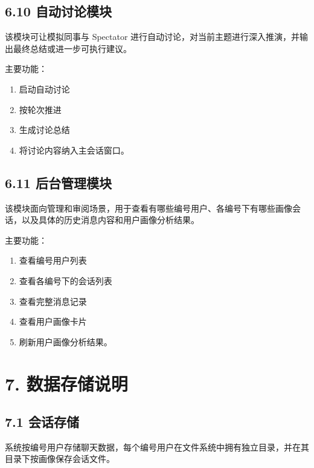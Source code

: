 \documentclass[12pt,a4paper]{article}
\begin{document}
\subsection*{6.10 自动讨论模块}
\vspace{0.45em}
该模块可让模拟同事与 Spectator 进行自动讨论，对当前主题进行深入推演，并输出最终总结或进一步可执行建议。\par
\vspace{0.45em}
主要功能：\par
\vspace{0.45em}
\begin{enumerate}
\item 启动自动讨论
\item 按轮次推进
\item 生成讨论总结
\item 将讨论内容纳入主会话窗口。
\end{enumerate}
\vspace{0.45em}
\subsection*{6.11 后台管理模块}
\vspace{0.45em}
该模块面向管理和审阅场景，用于查看有哪些编号用户、各编号下有哪些画像会话，以及具体的历史消息内容和用户画像分析结果。\par
\vspace{0.45em}
主要功能：\par
\vspace{0.45em}
\begin{enumerate}
\item 查看编号用户列表
\item 查看各编号下的会话列表
\item 查看完整消息记录
\item 查看用户画像卡片
\item 刷新用户画像分析结果。
\end{enumerate}
\newpage
{}
\fancyhead[R]{}
\vspace{0.45em}
\section*{7. 数据存储说明}
\vspace{0.45em}
\subsection*{7.1 会话存储}
\vspace{0.45em}
系统按编号用户存储聊天数据，每个编号用户在文件系统中拥有独立目录，并在其目录下按画像保存会话文件。\par
\vspace{0.45em}
\end{document}
